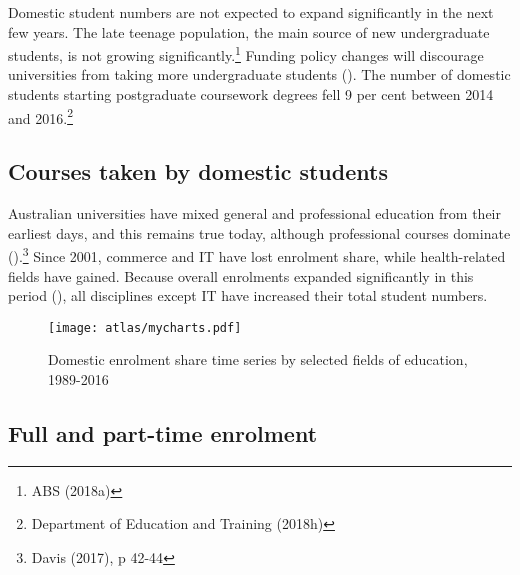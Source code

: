 \documentclass{grattan}
\begin{document}
Domestic student numbers are not expected to expand significantly in the next few years. The late teenage population, the main source of new undergraduate students, is not growing significantly.\footnote{ABS (2018a)} Funding policy changes will discourage universities from taking more undergraduate students (). The number of domestic students starting postgraduate coursework degrees fell 9 per cent between 2014 and 2016.\footnote{Department of Education and Training (2018h)}

%
\subsection{Courses taken by domestic students}\label{subsec:courses-taken-by-domestic-students}

Australian universities have mixed general and professional education from their earliest days, and this remains true today, although professional courses dominate ().\footnote{Davis (2017), p 42-44} Since 2001, commerce and IT have lost enrolment share, while health-related fields have gained. Because overall enrolments expanded significantly in this period (), all disciplines except IT have increased their total student numbers.

    \begin{figure} %
    \caption{Domestic enrolment share time series by selected fields of education, 1989-2016}\label{fig:domestic-enrolment-share-time-series-by-selected-fields-of-education-19892016}
    \units{}
    \texttt{[image: atlas/mycharts.pdf]}
    \end{figure}


%
\subsection{Full and part-time enrolment}\label{subsec:full-and-part-time-enrolment}
\end{document}

